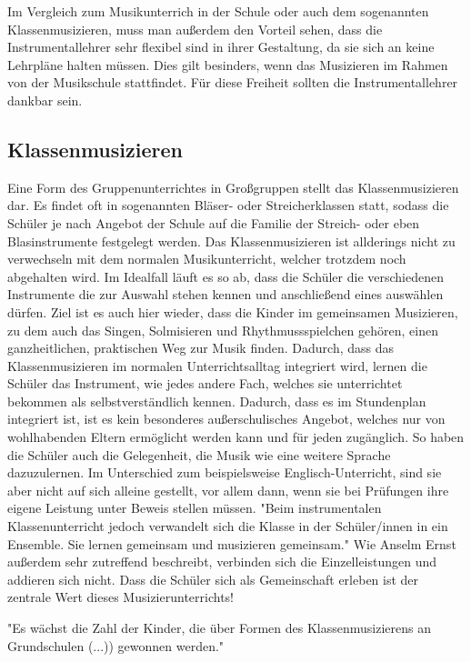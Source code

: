 Im Vergleich zum Musikunterrich in der Schule oder auch dem sogenannten
Klassenmusizieren, muss man außerdem den Vorteil sehen, dass die
Instrumentallehrer sehr flexibel sind in ihrer Gestaltung, da sie sich an keine
Lehrpläne halten müssen. Dies gilt besinders, wenn das Musizieren im Rahmen von
der Musikschule stattfindet. Für diese Freiheit sollten die Instrumentallehrer
dankbar sein.



\subsection{Klassenmusizieren}
Eine Form des Gruppenunterrichtes in Großgruppen stellt das Klassenmusizieren
dar. Es findet oft in sogenannten Bläser- oder Streicherklassen
statt, sodass die Schüler je nach Angebot der Schule auf die Familie der
Streich- oder eben Blasinstrumente festgelegt werden. Das Klassenmusizieren ist allderings
nicht zu verwechseln mit dem normalen Musikunterricht, welcher trotzdem noch
abgehalten wird.
Im Idealfall läuft es so
ab, dass die Schüler die verschiedenen Instrumente die zur Auswahl stehen kennen
und anschließend eines auswählen dürfen. Ziel ist es auch hier wieder, dass die
Kinder im gemeinsamen Musizieren, zu dem auch das Singen, Solmisieren und 
Rhythmussspielchen gehören, einen ganzheitlichen, praktischen Weg zur Musik
finden. \autocite[91]{ernst:die_zukunftsfaehige_musikschule}
Dadurch, dass das Klassenmusizieren im normalen Unterrichtsalltag integriert
wird, lernen die Schüler das Instrument, wie jedes andere Fach, welches sie
unterrichtet bekommen als selbstverständlich kennen. Dadurch, dass es im
Stundenplan integriert ist, ist es kein besonderes außerschulisches Angebot,
welches nur von wohlhabenden Eltern ermöglicht werden kann und für jeden
zugänglich. So haben die Schüler auch die Gelegenheit, die Musik wie eine
weitere Sprache dazuzulernen. Im Unterschied zum beispielsweise
Englisch-Unterricht, sind sie aber nicht auf sich alleine gestellt, vor allem
dann, wenn sie bei Prüfungen ihre eigene Leistung unter Beweis stellen müssen.
"Beim instrumentalen Klassenunterricht jedoch verwandelt sich die Klasse in der
Schüler/innen in ein Ensemble. Sie lernen gemeinsam und musizieren gemeinsam." \autocite[92]{ernst:die_zukunftsfaehige_musikschule}
Wie Anselm Ernst außerdem sehr zutreffend beschreibt, verbinden sich die
Einzelleistungen und addieren sich nicht. Dass die Schüler sich als Gemeinschaft
erleben ist der zentrale Wert dieses Musizierunterrichts!

"Es wächst die Zahl der Kinder, die über Formen des Klassenmusizierens an
Grundschulen (...)) gewonnen werden." %


